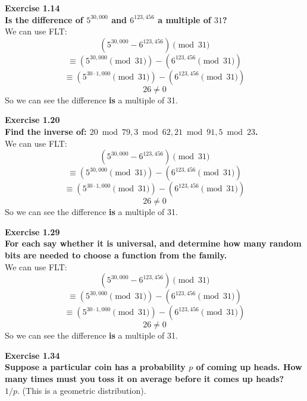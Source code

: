 \documentclass{article}
\newenvironment{problem}[2][Exercise]
    { \begin{mdframed}[backgroundcolor=gray!20] \textbf{#1 #2} \\}
    {  \end{mdframed}}
\begin{document}
\begin{problem}{1.14}
    \textbf{Is the difference of $5^{30,000}$ and $6^{123,456}$ a multiple of $31$?}
    \\
    We can use FLT:
    \[
        (5^{30,000} - 6^{123,456}) \pmod{31}
    \]
    \[
        \equiv (5^{30,000} \pmod{31}) - (6^{123,456} \pmod{31})
    \]
    \[
        \equiv (5^{30\cdot 1,000} \pmod{31}) - (6^{123,456} \pmod{31})
    \]
    \[
        26 \neq 0
    \]
    So we can see the difference \textbf{is} a multiple of 31.
\end{problem}

\begin{problem}{1.20}
    \textbf{Find the inverse of: $20 \bmod 79, 3 \bmod 62, 21 \bmod 91, 5 \bmod 23$.}
    \\
    We can use FLT:
    \[
        (5^{30,000} - 6^{123,456}) \pmod{31}
    \]
    \[
        \equiv (5^{30,000} \pmod{31}) - (6^{123,456} \pmod{31})
    \]
    \[
        \equiv (5^{30\cdot 1,000} \pmod{31}) - (6^{123,456} \pmod{31})
    \]
    \[
        26 \neq 0
    \]
    So we can see the difference \textbf{is} a multiple of 31.
\end{problem}

\begin{problem}{1.29}
    \textbf{For each say whether it is universal, and determine how many random bits are needed to choose a function from the family.}
    \\
    We can use FLT:
    \[
        (5^{30,000} - 6^{123,456}) \pmod{31}
    \]
    \[
        \equiv (5^{30,000} \pmod{31}) - (6^{123,456} \pmod{31})
    \]
    \[
        \equiv (5^{30\cdot 1,000} \pmod{31}) - (6^{123,456} \pmod{31})
    \]
    \[
        26 \neq 0
    \]
    So we can see the difference \textbf{is} a multiple of 31.
\end{problem}

\begin{problem}{1.34}
    \textbf{Suppose a particular coin has a probability $p$ of coming up heads. How many times must you toss it on average before it comes up heads?}
    \\
    $1/p$. (This is a geometric distribution).
\end{problem}
\end{document}
